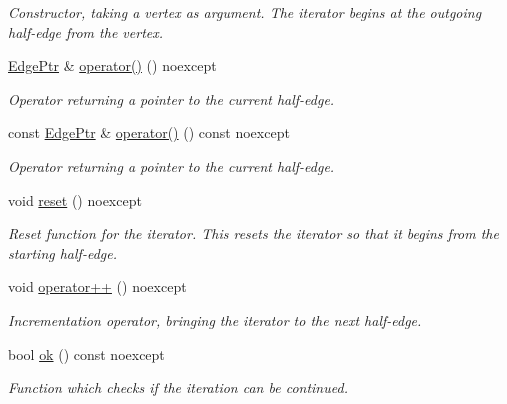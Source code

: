 \begin{DoxyCompactItemize}
\begin{DoxyCompactList}\small\item\em Constructor, taking a vertex as argument. The iterator begins at the outgoing half-\/edge from the vertex. \end{DoxyCompactList}\item 
\mbox{\label{classDcel_1_1EdgeIteratorT_a56e7dcbaf6f74f6c05b1eb9105d203ad}} 
\hyperlink{classDcel_1_1EdgeIteratorT_a75d19cf89d4ac007483aa8124482513b}{Edge\+Ptr} \& \hyperlink{classDcel_1_1EdgeIteratorT_a56e7dcbaf6f74f6c05b1eb9105d203ad}{operator()} () noexcept
\begin{DoxyCompactList}\small\item\em Operator returning a pointer to the current half-\/edge. \end{DoxyCompactList}\item 
\mbox{\label{classDcel_1_1EdgeIteratorT_a2e4afdda5a3eb033dc293fefc23edaa6}} 
const \hyperlink{classDcel_1_1EdgeIteratorT_a75d19cf89d4ac007483aa8124482513b}{Edge\+Ptr} \& \hyperlink{classDcel_1_1EdgeIteratorT_a2e4afdda5a3eb033dc293fefc23edaa6}{operator()} () const noexcept
\begin{DoxyCompactList}\small\item\em Operator returning a pointer to the current half-\/edge. \end{DoxyCompactList}\item 
\mbox{\label{classDcel_1_1EdgeIteratorT_ab1bc6f043869340ee1e1358e4289b8dd}} 
void \hyperlink{classDcel_1_1EdgeIteratorT_ab1bc6f043869340ee1e1358e4289b8dd}{reset} () noexcept
\begin{DoxyCompactList}\small\item\em Reset function for the iterator. This resets the iterator so that it begins from the starting half-\/edge. \end{DoxyCompactList}\item 
\mbox{\label{classDcel_1_1EdgeIteratorT_ae8dc40da0743b61725062646144b8f32}} 
void \hyperlink{classDcel_1_1EdgeIteratorT_ae8dc40da0743b61725062646144b8f32}{operator++} () noexcept
\begin{DoxyCompactList}\small\item\em Incrementation operator, bringing the iterator to the next half-\/edge. \end{DoxyCompactList}\item 
bool \hyperlink{classDcel_1_1EdgeIteratorT_a92bfca2d072bbf54c7be751f8fc4c098}{ok} () const noexcept
\begin{DoxyCompactList}\small\item\em Function which checks if the iteration can be continued. \end{DoxyCompactList}\end{DoxyCompactItemize}
